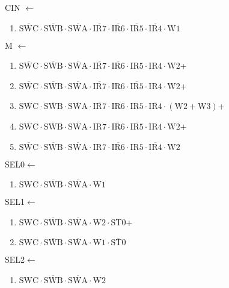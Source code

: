 \documentclass[UTF8]{ctexart}
\begin{document}
CIN $\leftarrow$
\begin{enumerate}[\indent\indent]
	\item $\overline{\text{SWC}} \cdot\overline{\text{SWB}}\cdot \overline{\text{SWA}} \cdot \overline{\text{IR7}} \cdot \overline{\text{IR6}} \cdot \overline{\text{IR5}} \cdot \overline{\text{IR4}} \cdot \text{W1}$
\end{enumerate}

M $\leftarrow$
\begin{enumerate}[\indent\indent]
	\item $\overline{\text{SWC}} \cdot\overline{\text{SWB}}\cdot \overline{\text{SWA}} \cdot \overline{\text{IR7}} \cdot \overline{\text{IR6}} \cdot \text{IR5} \cdot \text{IR4} \cdot \text{W2}$+
	\item $\overline{\text{SWC}} \cdot\overline{\text{SWB}}\cdot \overline{\text{SWA}} \cdot \overline{\text{IR7}} \cdot \text{IR6} \cdot \overline{\text{IR5}} \cdot \text{IR4} \cdot \text{W2}$+
	\item $\overline{\text{SWC}} \cdot\overline{\text{SWB}}\cdot \overline{\text{SWA}} \cdot \overline{\text{IR7}} \cdot \text{IR6} \cdot \text{IR5} \cdot \overline{\text{IR4}} \cdot (\text{W2} + \text{W3})$+
	\item $\overline{\text{SWC}} \cdot\overline{\text{SWB}}\cdot \overline{\text{SWA}} \cdot \text{IR7} \cdot \overline{\text{IR6}} \cdot \overline{\text{IR5}} \cdot \text{IR4} \cdot \text{W2}$+
	\item $\overline{\text{SWC}} \cdot\overline{\text{SWB}}\cdot \overline{\text{SWA}} \cdot \text{IR7} \cdot \overline{\text{IR6}} \cdot \text{IR5} \cdot \overline{\text{IR4}} \cdot \text{W2}$
\end{enumerate}

SEL0$\leftarrow$
\begin{enumerate}[\indent\indent]
	\item$\text{SWC}\cdot\overline{\text{SWB}}\cdot\overline{\text{SWA}}\cdot\text{W1}$
\end{enumerate}

SEL1$\leftarrow$
\begin{enumerate}[\indent\indent]
	\item$\text{SWC}\cdot\overline{\text{SWB}}\cdot\overline{\text{SWA}}\cdot\text{W2}\cdot\text{ST0}$+
	\item$\text{SWC}\cdot\overline{\text{SWB}}\cdot\overline{\text{SWA}}\cdot\text{W1}\cdot\overline{\text{ST0}}$
\end{enumerate}

SEL2$\leftarrow$
\begin{enumerate}[\indent\indent]
	\item$\text{SWC}\cdot\overline{\text{SWB}}\cdot\overline{\text{SWA}}\cdot\text{W2}$
\end{enumerate}
\end{document}
